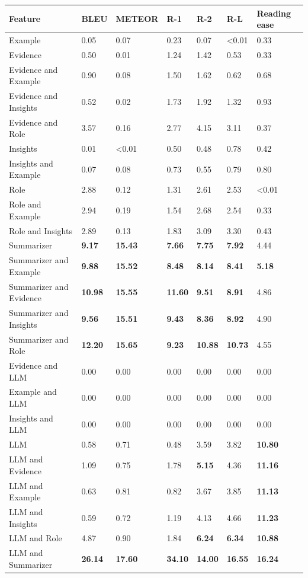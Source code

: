 \begin{tabular}{|l|l|l|l|l|l|l|}
\hline
\textbf{Feature} & BLEU & METEOR & R-1 & R-2 & R-L & Reading ease \\
 \hline
 Example & 0.05 & 0.07 & 0.23 & 0.07 & \textless{}0.01 & 0.33 \\
 \hline
 Evidence & 0.50 & 0.01 & 1.24 & 1.42 & 0.53 & 0.33 \\
 \hline
 Evidence and Example & 0.90 & 0.08 & 1.50 & 1.62 & 0.62 & 0.68 \\
 \hline
 Evidence and Insights & 0.52 & 0.02 & 1.73 & 1.92 & 1.32 & 0.93 \\
 \hline
 Evidence and Role & 3.57 & 0.16 & 2.77 & 4.15 & 3.11 & 0.37 \\
 \hline
 Insights & 0.01 & \textless{}0.01 & 0.50 & 0.48 & 0.78 & 0.42 \\
 \hline
 Insights and Example & 0.07 & 0.08 & 0.73 & 0.55 & 0.79 & 0.80 \\
 \hline
 Role & 2.88 & 0.12 & 1.31 & 2.61 & 2.53 & \textless{}0.01 \\
 \hline
 Role and Example & 2.94 & 0.19 & 1.54 & 2.68 & 2.54 & 0.33 \\
 \hline
 Role and Insights & 2.89 & 0.13 & 1.83 & 3.09 & 3.30 & 0.43 \\
 \hline
 Summarizer & \textbf{9.17} & \textbf{15.43} & \textbf{7.66} & \textbf{7.75} & \textbf{7.92} & 4.44 \\
 \hline
 Summarizer and Example & \textbf{9.88} & \textbf{15.52} & \textbf{8.48} & \textbf{8.14} & \textbf{8.41} & \textbf{5.18} \\
 \hline
 Summarizer and Evidence & \textbf{10.98} & \textbf{15.55} & \textbf{11.60} & \textbf{9.51} & \textbf{8.91} & 4.86 \\
 \hline
 Summarizer and Insights & \textbf{9.56} & \textbf{15.51} & \textbf{9.43} & \textbf{8.36} & \textbf{8.92} & 4.90 \\
 \hline
 Summarizer and Role & \textbf{12.20} & \textbf{15.65} & \textbf{9.23} & \textbf{10.88} & \textbf{10.73} & 4.55 \\
 \hline
 Evidence and LLM & 0.00 & 0.00 & 0.00 & 0.00 & 0.00 & 0.00 \\
 \hline
 Example and LLM & 0.00 & 0.00 & 0.00 & 0.00 & 0.00 & 0.00 \\
 \hline
 Insights and LLM & 0.00 & 0.00 & 0.00 & 0.00 & 0.00 & 0.00 \\
 \hline
 LLM & 0.58 & 0.71 & 0.48 & 3.59 & 3.82 & \textbf{10.80} \\
 \hline
 LLM and Evidence & 1.09 & 0.75 & 1.78 & \textbf{5.15} & 4.36 & \textbf{11.16} \\
 \hline
 LLM and Example & 0.63 & 0.81 & 0.82 & 3.67 & 3.85 & \textbf{11.13} \\
 \hline
 LLM and Insights & 0.59 & 0.72 & 1.19 & 4.13 & 4.66 & \textbf{11.23} \\
 \hline
 LLM and Role & 4.87 & 0.90 & 1.84 & \textbf{6.24} & \textbf{6.34} & \textbf{10.88} \\
 \hline
 LLM and Summarizer & \textbf{26.14} & \textbf{17.60} & \textbf{34.10} & \textbf{14.00} & \textbf{16.55} & \textbf{16.24} \\
\hline
\end{tabular}
